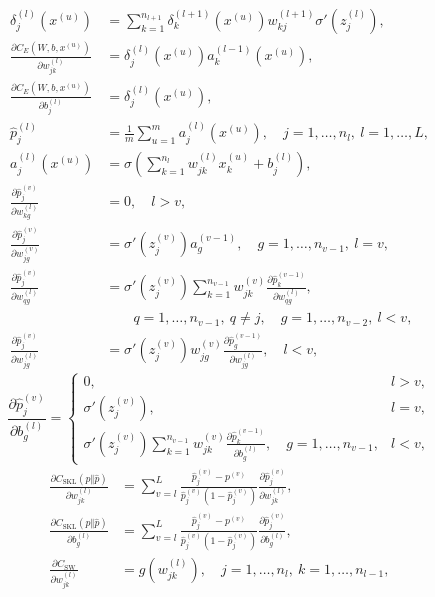 \[
\begin{aligned}
\delta_j^{(l)}(x^{(u)})&=\sum_{k=1}^{n_{l+1}}\delta_k^{(l+1)}(x^{(u)})w_{kj}^{(l+1)}\sigma'(z_j^{(l)}),\\
\frac{\partial C_E(W,b,x^{(u)})}{\partial w_{jk}^{(l)}}&=\delta_j^{(l)}(x^{(u)})a_k^{(l-1)}(x^{(u)}),\\
\frac{\partial C_E(W,b,x^{(u)})}{\partial b_j^{(l)}}&=\delta_j^{(l)}(x^{(u)}),\\
\widehat p_j^{(l)}&=\frac1m\sum_{u=1}^ma_j^{(l)}(x^{(u)}),\quad j=1,\ldots,n_l,\ l=1,\ldots,L,\\
a_j^{(l)}(x^{(u)})&=\sigma\left(\sum_{k=1}^{n_l}w_{jk}^{(l)}x_k^{(u)}+b_j^{(l)}\right),\\
\frac{\partial\widehat p_j^{(v)}}{\partial w_{kg}^{(l)}}&=0,\quad l>v,\\
\frac{\partial\widehat p_j^{(v)}}{\partial w_{jg}^{(v)}}&=\sigma'(z_j^{(v)})a_g^{(v-1)},\quad g=1,\ldots,n_{v-1},\ l=v,\\
\frac{\partial\widehat p_j^{(v)}}{\partial w_{qg}^{(l)}}&=\sigma'(z_j^{(v)})\sum_{k=1}^{n_{v-1}}w_{jk}^{(v)}\frac{\partial\widehat p_k^{(v-1)}}{\partial w_{qg}^{(l)}},\\
&\qquad q=1,\ldots,n_{v-1},\ q\ne j,\quad g=1,\ldots,n_{v-2},\ l<v,\\
\frac{\partial\widehat p_j^{(v)}}{\partial w_{jg}^{(l)}}&=\sigma'(z_j^{(v)})w_{jg}^{(v)}\frac{\partial\widehat p_g^{(v-1)}}{\partial w_{jg}^{(l)}},\quad l<v,
\end{aligned}
\]
\[
\frac{\partial\widehat p_j^{(v)}}{\partial b_g^{(l)}}=\begin{cases}
0,&l>v,\\
\sigma'(z_j^{(v)}),&l=v,\\
\sigma'(z_j^{(v)})\displaystyle\sum_{k=1}^{n_{v-1}}w_{jk}^{(v)}\frac{\partial\widehat p_k^{(v-1)}}{\partial b_g^{(l)}},\quad g=1,\ldots,n_{v-1},&l<v,
\end{cases}
\]
\[
\begin{aligned}
\frac{\partial C_{\mathrm{SKL}}(p\Vert\widehat p)}{\partial w_{jk}^{(l)}}&=\sum_{v=l}^L\frac{\widehat p_j^{(v)}-p^{(v)}}{\widehat p_j^{(v)}(1-\widehat p_j^{(v)})}\frac{\partial\widehat p_j^{(v)}}{\partial w_{jk}^{(l)}},\\
\frac{\partial C_{\mathrm{SKL}}(p\Vert\widehat p)}{\partial b_g^{(l)}}&=\sum_{v=l}^L\frac{\widehat p_j^{(v)}-p^{(v)}}{\widehat p_j^{(v)}(1-\widehat p_j^{(v)})}\frac{\partial\widehat p_j^{(v)}}{\partial b_g^{(l)}},\\
\frac{\partial C_{\mathrm{SW}}}{\partial w_{jk}^{(l)}}&=g(w_{jk}^{(l)}),\quad j=1,\ldots,n_l,\ k=1,\ldots,n_{l-1},
\end{aligned}
\]
